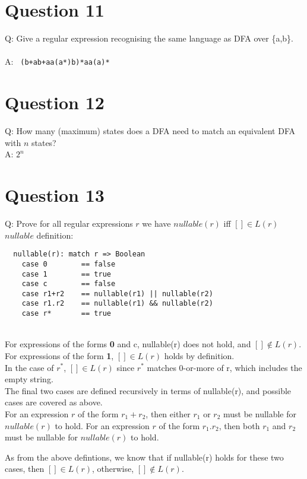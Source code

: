 \documentclass[english]{scrartcl}
\begin{document}
\section*{Question 11}

Q: Give a regular expression recognising the same language as DFA over \{a,b\}. \\
\\
A: \verb~ (b+ab+aa(a*)b)*aa(a)* ~

\section*{Question 12}
Q: How many (maximum) states does a DFA need to match an equivalent DFA with $n$ states?\\
A: $2^n$

\section*{Question 13}
Q: Prove for all regular expressions $r$ we have $nullable(r)$ iff $[] \in L(r)$
\\
$nullable$ definition:
\begin{verbatim}
  nullable(r): match r => Boolean
    case 0        == false
    case 1        == true
    case c        == false
    case r1+r2    == nullable(r1) || nullable(r2)
    case r1.r2    == nullable(r1) && nullable(r2)
    case r*       == true
\end{verbatim}
\mbox{ }\\

For expressions of the forms \textbf{0} and c, nullable(r) does not hold, and $[] \notin L(r)$. \\

For expressions of the form \textbf{1}, $[] \in L(r)$ holds by definition. \\

In the case of $r^*$, $[] \in L(r)$ since $r^*$ matches 0-or-more of r, which includes the empty string. \\

The final two cases are defined recursively in terms of nullable(r), and possible cases are covered as above. \\

For an expression $r$ of the form $r_1 + r_2$, then either $r_1$ or $r_2$ must be nullable for $nullable(r)$ to hold.
For an expression $r$ of the form $r_1 . r_2$, then both $r_1$ and $r_2$ must be nullable for $nullable(r)$ to hold.

As from the above defintions, we know that if nullable(r) holds for these two cases, then $[] \in L(r)$, otherwise, $[] \notin L(r)$.
\end{document}
